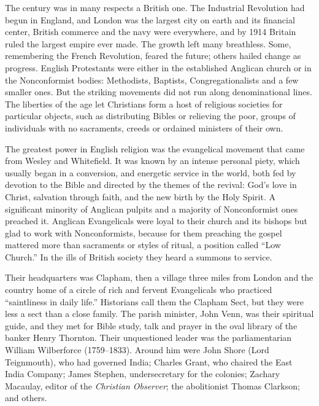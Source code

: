 The century was in many respects a British one. The Industrial Revolution had begun in England, and London was the largest city on earth and its financial center, British commerce and the navy were
everywhere, and by 1914 Britain ruled the largest empire ever made. The growth left many breathless.
Some, remembering the French Revolution, feared the future; others hailed change as progress. English
Protestants were either in the established Anglican church or in the Nonconformist bodies:
Methodists, Baptists, Congregationalists and a few smaller ones. But the striking movements did not
run along denominational lines. The liberties of the age let Christians form a host of religious
societies for particular objects, such as distributing Bibles or relieving the poor, groups of
individuals with no sacraments, creeds or ordained ministers of their own.

The greatest power in English religion was the evangelical movement that came from Wesley and
Whitefield. It was known by an intense personal piety, which usually began in a conversion, and energetic
service in the world, both fed by devotion to the Bible and directed by the themes of the revival:
God's love in Christ, salvation through faith, and the new birth by the Holy Spirit. A significant
minority of Anglican pulpits and a majority of Nonconformist ones preached it. Anglican Evangelicals
were loyal to their church and its bishops but glad to work with Nonconformists, because for them preaching the gospel mattered more than sacraments or styles of ritual, a position called
``Low Church.'' In the ills of British society they heard a summons to service.

Their headquarters was Clapham, then a village three miles from London and the country home of a circle of rich and fervent Evangelicals who practiced ``saintliness in daily life.'' Historians call
them the Clapham Sect, but they were less a sect than a close family. The parish minister, John Venn,
was their spiritual guide, and they met for Bible study, talk and prayer in the oval library of the
banker Henry Thornton. Their unquestioned leader was the parliamentarian William Wilberforce
(1759--1833). Around him were John Shore (Lord Teignmouth), who had governed India; Charles Grant, who chaired the East India Company; James Stephen, undersecretary for the colonies; Zachary Macaulay,
editor of the \emph{Christian Observer}; the abolitionist Thomas Clarkson; and others.

